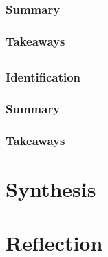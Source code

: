 \documentclass[
	letterpaper, %
]{jdf}
\begin{document}
\subsubsection{Summary}


\subsubsection{Takeaways}

 \subsection{\fullcite{}}
\subsubsection{Identification}


\subsubsection{Summary}


\subsubsection{Takeaways}
\section{Synthesis}


\section{Reflection}
\end{document}
